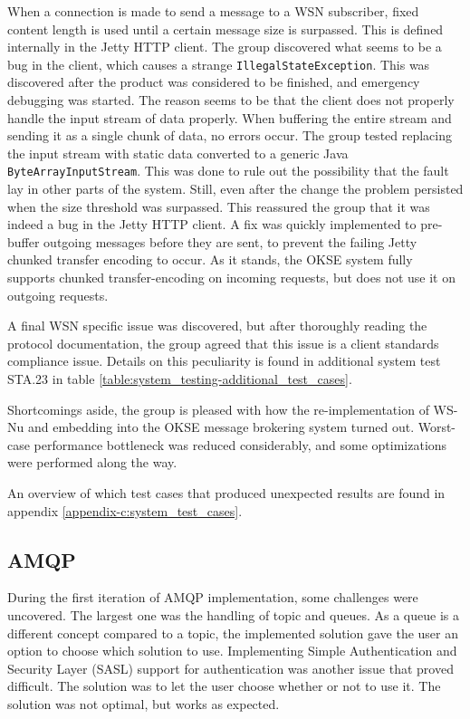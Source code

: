 When a connection is made to send a message to a WSN subscriber, fixed content length is used until a certain message size is surpassed. This is defined internally in the Jetty HTTP client. The group discovered what seems to be a bug in the client, which causes a strange \verb!IllegalStateException!. This was discovered after the product was considered to be finished, and emergency debugging was started. The reason seems to be that the client does not properly handle the input stream of data properly. When buffering the entire stream and sending it as a single chunk of data, no errors occur. The group tested replacing the input stream with static data converted to a generic Java \verb!ByteArrayInputStream!. This was done to rule out the possibility that the fault lay in other parts of the system. Still, even after the change the problem persisted when the size threshold was surpassed. This reassured the group that it was indeed a bug in the Jetty HTTP client. A fix was quickly implemented to pre-buffer outgoing messages before they are sent, to prevent the failing Jetty chunked transfer encoding to occur. As it stands, the OKSE system fully supports chunked transfer-encoding on incoming requests, but does not use it on outgoing requests.

A final WSN specific issue was discovered, but after thoroughly reading the protocol documentation, the group agreed that this issue is a client standards compliance issue. Details on this peculiarity is found in additional system test STA.23 in table \ref{table:system_testing-additional_test_cases}.

Shortcomings aside, the group is pleased with how the re-implementation of WS-Nu and embedding into the OKSE message brokering system turned out. Worst-case performance bottleneck was reduced considerably, and some optimizations were performed along the way.

An overview of which test cases that produced unexpected results are found in appendix \ref{appendix-c:system_test_cases}.

\subsection{AMQP}
\label{subsec:Implementation_AMQP}

During the first iteration of AMQP implementation, some challenges were uncovered. The largest one was the handling of topic and queues. As a queue is a different concept compared to a topic, the implemented solution gave the user an option to choose which solution to use. Implementing Simple Authentication and Security Layer (SASL) support for authentication was another issue that proved difficult. The solution was to let the user choose whether or not to use it. The solution was not optimal, but works as expected.

